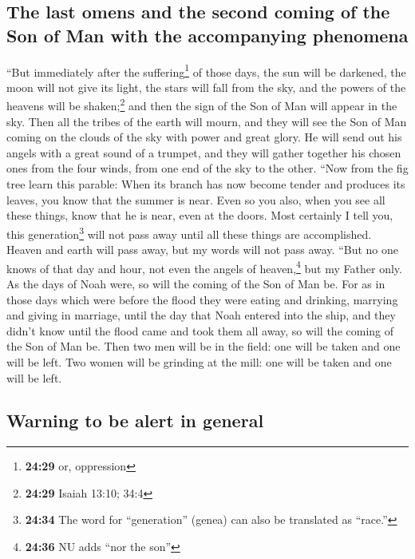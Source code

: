 \hypertarget{the-last-omens-and-the-second-coming-of-the-son-of-man-with-the-accompanying-phenomena}{%
\subsection{The last omens and the second coming of the Son of Man with
the accompanying
phenomena}\label{the-last-omens-and-the-second-coming-of-the-son-of-man-with-the-accompanying-phenomena}}

 ``But immediately after the suffering\footnote{\textbf{24:29}
  or, oppression} of those days, the sun will be darkened, the moon will
not give its light, the stars will fall from the sky, and the powers of
the heavens will be shaken;\footnote{\textbf{24:29} Isaiah 13:10; 34:4}
 and then the sign of the Son of Man will appear in the
sky. Then all the tribes of the earth will mourn, and they will see the
Son of Man coming on the clouds of the sky with power and great glory.
 He will send out his angels with a great sound of a
trumpet, and they will gather together his chosen ones from the four
winds, from one end of the sky to the other.  ``Now from
the fig tree learn this parable: When its branch has now become tender
and produces its leaves, you know that the summer is near.
 Even so you also, when you see all these things, know
that he is near, even at the doors.  Most certainly I
tell you, this generation\footnote{\textbf{24:34} The word for
  ``generation'' (genea) can also be translated as ``race.''} will not
pass away until all these things are accomplished. 
Heaven and earth will pass away, but my words will not pass away.
 ``But no one knows of that day and hour, not even the
angels of heaven,\footnote{\textbf{24:36} NU adds ``nor the son''} but
my Father only.  As the days of Noah were, so will the
coming of the Son of Man be.  For as in those days which
were before the flood they were eating and drinking, marrying and giving
in marriage, until the day that Noah entered into the ship,
 and they didn't know until the flood came and took them
all away, so will the coming of the Son of Man be.  Then
two men will be in the field: one will be taken and one will be left.
 Two women will be grinding at the mill: one will be
taken and one will be left.

\hypertarget{warning-to-be-alert-in-general}{%
\subsection{Warning to be alert in
general}\label{warning-to-be-alert-in-general}}


